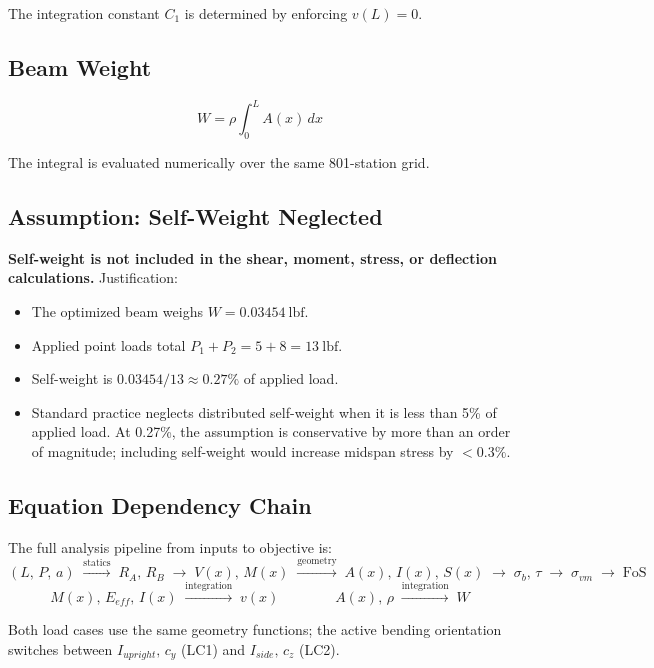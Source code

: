 \documentclass[11pt,letterpaper]{article}
\begin{document}
The integration constant $C_1$ is determined by enforcing $v(L) = 0$.

\subsection{Beam Weight}

\[
  W = \rho \int_0^{L} A(x)\,dx
\]

The integral is evaluated numerically over the same 801-station grid.

\subsection{Assumption: Self-Weight Neglected}

\textbf{Self-weight is not included in the shear, moment, stress, or
deflection calculations.}  Justification:

\begin{itemize}[noitemsep]
  \item The optimized beam weighs $W = 0.03454\ \mathrm{lbf}$.
  \item Applied point loads total $P_1 + P_2 = 5 + 8 = 13\ \mathrm{lbf}$.
  \item Self-weight is $0.03454 / 13 \approx 0.27\%$ of applied load.
  \item Standard practice neglects distributed self-weight when it is less
    than 5\% of applied load.  At 0.27\%, the assumption is conservative
    by more than an order of magnitude; including self-weight would increase
    midspan stress by $< 0.3\%$.
\end{itemize}

\subsection{Equation Dependency Chain}

The full analysis pipeline from inputs to objective is:
\[
  (L,\,P,\,a)
  \;\xrightarrow{\text{statics}}\;
  R_A,\,R_B
  \;\xrightarrow{}\;
  V(x),\,M(x)
  \;\xrightarrow{\text{geometry}}\;
  A(x),\,I(x),\,S(x)
  \;\xrightarrow{}\;
  \sigma_b,\,\tau
  \;\xrightarrow{}\;
  \sigma_{vm}
  \;\xrightarrow{}\;
  \mathrm{FoS}
\]
\[
  M(x),\,E_{eff},\,I(x)
  \;\xrightarrow{\text{integration}}\;
  v(x)
  \qquad\qquad
  A(x),\,\rho
  \;\xrightarrow{\text{integration}}\;
  W
\]

Both load cases use the same geometry functions; the active bending
orientation switches between $I_{upright},\,c_y$ (LC1) and $I_{side},\,c_z$ (LC2).
\end{document}
